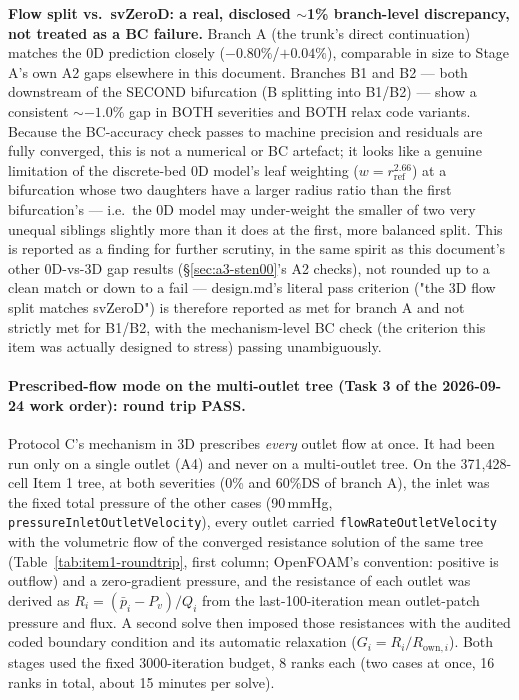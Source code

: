 \documentclass[11pt]{article}
\begin{document}
\textbf{Flow split vs.\ svZeroD: a real, disclosed $\sim$1\% branch-level discrepancy, not treated as
a BC failure.} Branch A (the trunk's direct continuation) matches the 0D prediction closely
($-0.80\%$/$+0.04\%$), comparable in size to Stage A's own A2 gaps elsewhere in this document. Branches
B1 and B2 --- both downstream of the SECOND bifurcation (B splitting into B1/B2) --- show a consistent
$\sim$$-1.0\%$ gap in BOTH severities and BOTH relax code variants. Because the BC-accuracy check passes
to machine precision and residuals are fully converged, this is not a numerical or BC artefact; it looks
like a genuine limitation of the discrete-bed 0D model's leaf weighting ($w=r_\text{ref}^{2.66}$) at a
bifurcation whose two daughters have a larger radius ratio than the first bifurcation's --- i.e.\ the 0D
model may under-weight the smaller of two very unequal siblings slightly more than it does at the first,
more balanced split. This is reported as a finding for further scrutiny, in the same spirit as this
document's other 0D-vs-3D gap results (\S\ref{sec:a3-sten00}'s A2 checks), not rounded up to a clean
match or down to a fail --- design.md's literal pass criterion ("the 3D flow split matches svZeroD") is
therefore reported as met for branch A and not strictly met for B1/B2, with the mechanism-level BC check
(the criterion this item was actually designed to stress) passing unambiguously.

\paragraph{Prescribed-flow mode on the multi-outlet tree (Task 3 of the 2026-09-24 work order): round trip PASS.} Protocol C's mechanism in 3D prescribes \emph{every} outlet flow at once. It had been run only on a single outlet (A4) and never on a multi-outlet tree. On the 371{,}428-cell Item 1 tree, at both severities (0\% and 60\%DS of branch A), the inlet was the fixed total pressure of the other cases (90\,mmHg, \texttt{pressureInletOutletVelocity}), every outlet carried \texttt{flowRateOutletVelocity} with the volumetric flow of the converged resistance solution of the same tree (Table~\ref{tab:item1-roundtrip}, first column; OpenFOAM's convention: positive is outflow) and a zero-gradient pressure, and the resistance of each outlet was derived as $R_i=(\bar p_i-P_v)/Q_i$ from the last-100-iteration mean outlet-patch pressure and flux. A second solve then imposed those resistances with the audited coded boundary condition and its automatic relaxation ($G_i=R_i/R_{\text{own},i}$). Both stages used the fixed 3000-iteration budget, 8 ranks each (two cases at once, 16 ranks in total, about 15 minutes per solve).
\end{document}
